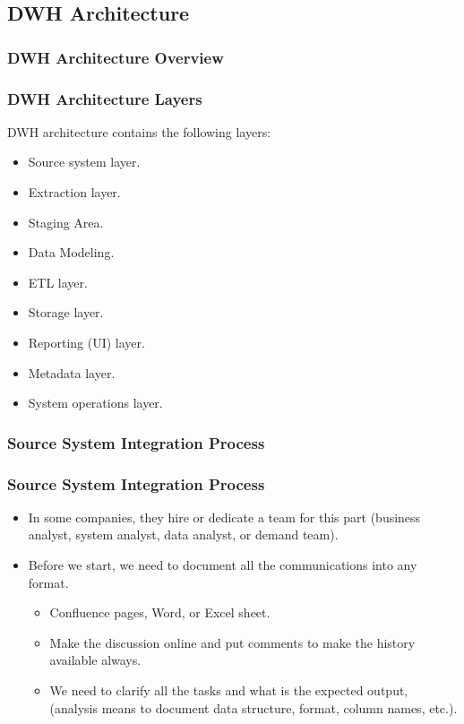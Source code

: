 \subsection{DWH Architecture}
\begin{frame}
\frametitle{DWH Architecture Overview}

\end{frame}
\begin{frame}
\frametitle{DWH Architecture Layers}

\begin{wideitemize}
	\item DWH architecture contains the following layers:
	\begin{itemize}[<+->]
		\item Source system layer.
		\item Extraction layer.
		\item Staging Area.
		\item Data Modeling.
		\item ETL layer.
		\item Storage layer.
		\item Reporting (UI) layer.
		\item Metadata layer.
		\item System operations layer.
	\end{itemize}
\end{wideitemize}

\end{frame}
\VideoClassification[column=2, colour=blue]
\subsubsection{Source System Integration Process}
\begin{frame}
    \frametitle{Source System Integration Process}
    \begin{itemize}[<+->]
        \item In some companies, they hire or dedicate a team for this part (business analyst, system analyst, data analyst, or demand team).
        \item Before we start, we need to document all the communications into any format.
		\begin{itemize}
            \item Confluence pages, Word, or Excel sheet.
            \item Make the discussion online and put comments to make the history available always.
			\item We need to clarify all the tasks and what is the expected output, \forexample (analysis means to document data structure, format, column names, etc.).
        \end{itemize}
    \end{itemize}

\end{frame}

